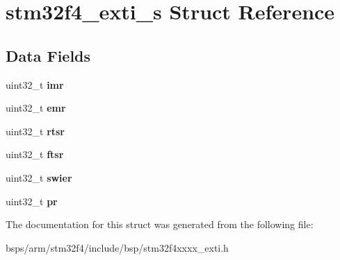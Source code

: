 \hypertarget{structstm32f4__exti__s}{}\section{stm32f4\+\_\+exti\+\_\+s Struct Reference}
\label{structstm32f4__exti__s}
\subsection*{Data Fields}
\begin{DoxyCompactItemize}
\item 
\mbox{\label{structstm32f4__exti__s_a0a6164d32aedb67118ff17ddcc64c6a6}} 
uint32\+\_\+t {\bfseries imr}
\item 
\mbox{\label{structstm32f4__exti__s_a0516d6dff539f36bcc830fb8ab5b3b93}} 
uint32\+\_\+t {\bfseries emr}
\item 
\mbox{\label{structstm32f4__exti__s_a155b8704063c5cc03d8d26eaa80426f2}} 
uint32\+\_\+t {\bfseries rtsr}
\item 
\mbox{\label{structstm32f4__exti__s_ace5bfa2c389a27b0567dd40e4e9ebe3b}} 
uint32\+\_\+t {\bfseries ftsr}
\item 
\mbox{\label{structstm32f4__exti__s_acfd7a623f798726964ae373ffb6fe51f}} 
uint32\+\_\+t {\bfseries swier}
\item 
\mbox{\label{structstm32f4__exti__s_a023042ced1c6a6505bf99070509d9c28}} 
uint32\+\_\+t {\bfseries pr}
\end{DoxyCompactItemize}


The documentation for this struct was generated from the following file\+:\begin{DoxyCompactItemize}
\item 
bsps/arm/stm32f4/include/bsp/stm32f4xxxx\+\_\+exti.\+h\end{DoxyCompactItemize}
